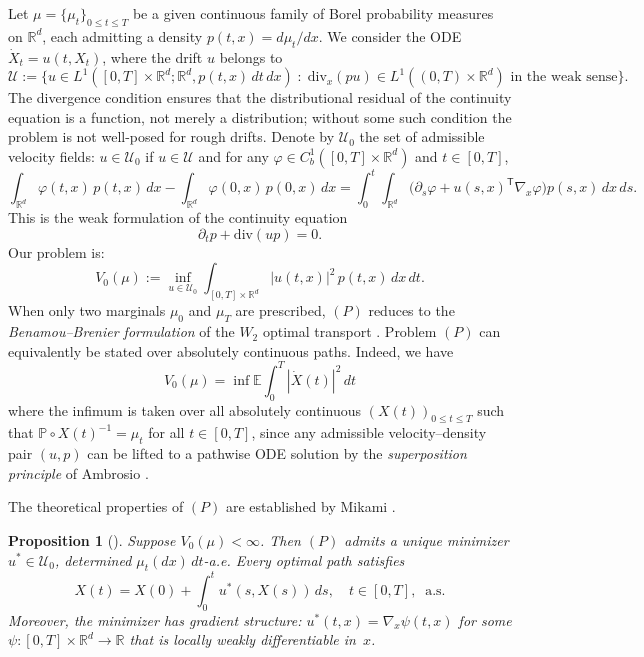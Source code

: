 \documentclass[11pt,leqno]{article}
\theoremstyle{plain}
\newtheorem{prop}{Proposition}
\theoremstyle{remark}
\theoremstyle{definition}
\numberwithin{equation}{section}
\numberwithin{figure}{section}
\numberwithin{table}{section}
\begin{document}
Let $\mu=\{\mu_t\}_{0\le t\le T}$ be a given continuous family of Borel 
probability measures on $\mathbb{R}^d$, each admitting a density
$p(t,x)=d\mu_t/dx$.
We consider the ODE $\dot X_t = u(t,X_t)$, where the drift $u$ belongs to
\[
 \mathcal{U}:=\bigl\{u\in L^1([0,T]\times\mathbb{R}^d;\mathbb{R}^d,p(t,x)\,dt\,dx)
 \;:\; \mathrm{div}_x(pu)\in L^1((0,T)\times\mathbb{R}^d)\text{ in the weak sense}\bigr\}.
\]
The divergence condition ensures that the distributional residual of
the continuity equation is a function, not merely a distribution;
without some such condition the problem is not well-posed for rough
drifts.
Denote by $\mathcal{U}_0$ the set of admissible velocity fields:
$u\in\mathcal{U}_0$ if
$u\in \mathcal{U}$ and
for any $\varphi\in C^{1}_b([0,T]\times\mathbb{R}^d)$ and $t\in[0,T]$,
\begin{equation}\label{eq:weak-CE}
 \int_{\mathbb{R}^d}\varphi(t,x)\,p(t,x)\,dx
 - \int_{\mathbb{R}^d}\varphi(0,x)\,p(0,x)\,dx
 = \int_0^t\!\int_{\mathbb{R}^d}
   \bigl(\partial_s\varphi + u(s,x)^{\mathsf{T}}\nabla_x\varphi\bigr)
   p(s,x)\,dx\,ds.
\end{equation}
This is the weak formulation of the continuity equation
\begin{equation}\label{eq:continuity}
  \partial_t p + \mathrm{div}(up)=0.
\end{equation}
Our problem is:
\begin{equation}
\tag{$P$}\label{eq:P0}
  V_0(\mu)
  := \inf_{u\in\mathcal{U}_0}
     \int_{[0,T]\times\mathbb{R}^d} |u(t,x)|^2\,p(t,x)\,dx\,dt.
\end{equation}
When only two marginals $\mu_0$ and $\mu_T$ are prescribed, $(P)$ reduces to the
\emph{Benamou--Brenier formulation} of the $W_2$ optimal transport
\cite{ben-bre:2000}.
Problem $(P)$ can equivalently be stated over absolutely continuous paths. Indeed, we have 
\[
 V_0(\mu)= \inf\mathbb{E}\!\int_0^T\!|\dot X(t)|^2\,dt
\]
where the infimum is taken over all absolutely continuous $(X(t))_{0\le t\le T}$ such that $\mathbb{P}\circ X(t)^{-1}=\mu_t$ for all $t\in [0,T]$, 
since any admissible velocity--density pair $(u,p)$ can be lifted to a pathwise
ODE solution by the \emph{superposition principle} of Ambrosio
\cite[Theorem~3.9]{Mikami2021}.

%

The theoretical properties of $(P)$ are established by Mikami
\cite[Section~3.2.2]{Mikami2021}.
\begin{prop}[{\cite[Theorem~3.8, Proposition~3.7]{Mikami2021}}]
\label{prop:existence}
Suppose $V_0(\mu)<\infty$.
Then $(P)$ admits a unique minimizer $u^*\in\mathcal{U}_0$, determined
$\mu_t(dx)\,dt$-a.e.
Every optimal path satisfies
\begin{equation}\label{eq:ode-minimizer}
  X(t) = X(0) + \int_0^t u^*(s,X(s))\,ds, \quad t\in[0,T],\;\; \text{a.s.}
\end{equation}
Moreover, the minimizer has gradient structure:
$u^*(t,x)=\nabla_x\psi(t,x)$ for some $\psi:[0,T]\times\mathbb{R}^d\to\mathbb{R}$ that is
locally weakly differentiable in~$x$.
\end{prop}
\end{document}
